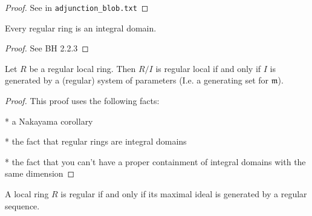 \begin{proof}
  See in \verb|adjunction_blob.txt|
\end{proof}

\begin{lemma}
  \label{lem:reg_int_dom}
  Every regular ring is an integral domain.
\end{lemma}

\begin{proof}

  See BH 2.2.3

\end{proof}

\begin{proposition}[BH 2.2.4]
  \label{prop:reg_quot_sys_param}
  Let $R$ be a regular local ring. 
  Then $R / I$ is regular local if and only if 
  $I$ is generated by a (regular) system of parameters
  (I.e. a generating set for $\mathfrak{m}$).
\end{proposition}

\begin{proof}
  This proof uses the following facts:

  * a Nakayama corollary
  
  * the fact that regular rings are integral domains

  * the fact that you can't have a proper containment
    of integral domains with the same dimension
\end{proof}

\begin{proposition}
  \label{prop:reg_loc_maximal_reg_seq}
  A local ring $R$ is regular if and only if
  its maximal ideal is generated by a regular sequence.
\end{proposition}

